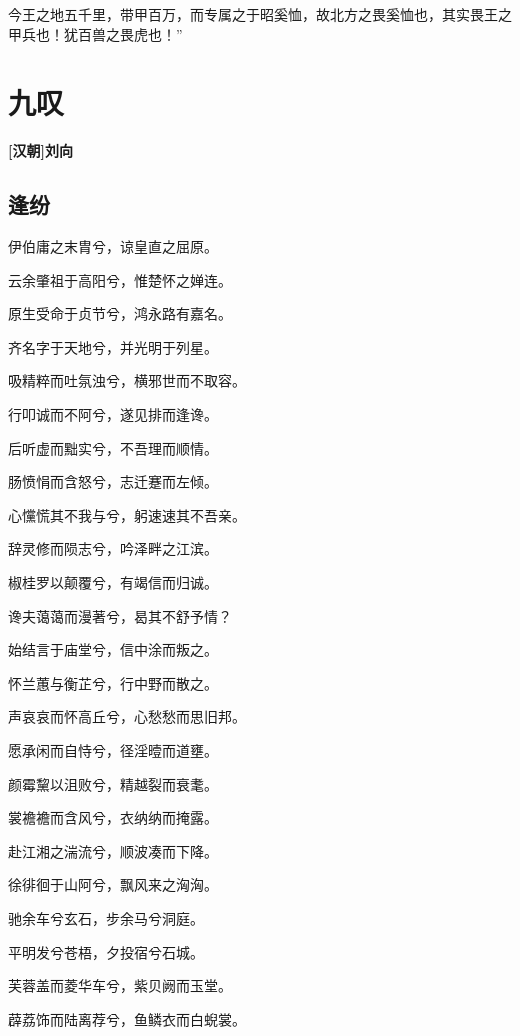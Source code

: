 \documentclass[UTF8,titlepage,oneside]{ctexbook}
\begin{document}
今王之地五千里，带甲百万，而专属之于昭奚恤，故北方之畏奚恤也，其实畏王之甲兵也！犹百兽之畏虎也！”

\chapter*{九叹}
\begin{center}
	\textbf{[汉朝]刘向}
\end{center}

\section*{逢纷}
\begin{center}
	
	伊伯庸之末胄兮，谅皇直之屈原。
	
	云余肇祖于高阳兮，惟楚怀之婵连。
	
	原生受命于贞节兮，鸿永路有嘉名。
	
	齐名字于天地兮，并光明于列星。
	
	吸精粹而吐氛浊兮，横邪世而不取容。
	
	行叩诚而不阿兮，遂见排而逢谗。
	
	后听虚而黜实兮，不吾理而顺情。
	
	肠愤悁而含怒兮，志迁蹇而左倾。
	
	心戃慌其不我与兮，躬速速其不吾亲。
	
	辞灵修而陨志兮，吟泽畔之江滨。
	
	椒桂罗以颠覆兮，有竭信而归诚。
	
	谗夫蔼蔼而漫著兮，曷其不舒予情？
	
	始结言于庙堂兮，信中涂而叛之。
	
	怀兰蕙与衡芷兮，行中野而散之。
	
	声哀哀而怀高丘兮，心愁愁而思旧邦。
	
	愿承闲而自恃兮，径淫曀而道壅。
	
	颜霉黧以沮败兮，精越裂而衰耄。
	
	裳襜襜而含风兮，衣纳纳而掩露。
	
	赴江湘之湍流兮，顺波凑而下降。
	
	徐徘徊于山阿兮，飘风来之洶洶。
	
	驰余车兮玄石，步余马兮洞庭。
	
	平明发兮苍梧，夕投宿兮石城。
	
	芙蓉盖而菱华车兮，紫贝阙而玉堂。
	
	薜荔饰而陆离荐兮，鱼鳞衣而白蜺裳。
	

\end{center}
\end{document}
